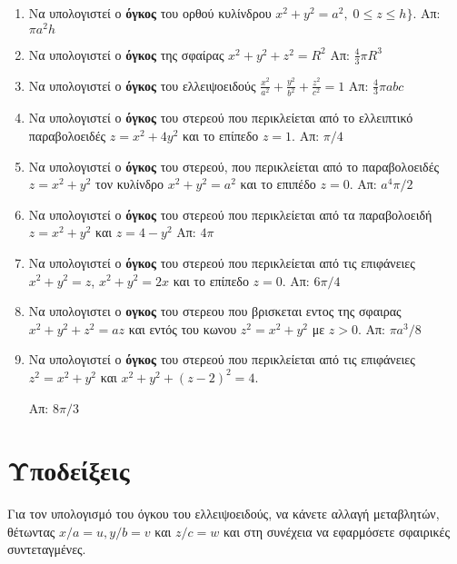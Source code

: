\begin{enumerate}
  \item Να υπολογιστεί ο \textbf{όγκος} του ορθού κυλίνδρου $ x^{2}+y^{2} = a^{2},
  \; 0 \leq z \leq h \}  $.  \hfill Απ:  $ \pi a^{2} h $

\item Να υπολογιστεί ο \textbf{όγκος} της σφαίρας $ x^{2}+y^{2}+z^{2} = R^{2} $
  \hfill Απ: $ \frac{4}{3} \pi R^{3} $ 

\item Να υπολογιστεί ο \textbf{όγκος} του ελλειψοειδούς $ \frac{x^{2}}{a^{2}} +
  \frac{y^{2}}{b^{2}} + \frac{z^{2}}{c^{2}} =1 $ 
  \hfill Απ: $ \frac{4}{3} \pi abc $ 

\item Να υπολογιστεί ο \textbf{όγκος} του στερεού που περικλείεται από το 
  ελλειπτικό παραβολοειδές $ z=x^{2}+4y^{2} $ και το επίπεδο $ z=1 $. 
  \hfill Απ: $ \pi /4 $ 

\item Να υπολογιστεί ο \textbf{όγκος} του στερεού, που περικλείεται από 
  το παραβολοειδές $ z = x^{2}+y^{2} $ τον κυλίνδρο $ x^{2}+y^{2}=a^{2} $ και 
  το επιπέδο $ z = 0$.  
  \hfill Απ: $ a^{4} {\pi}/{2} $  

\item Να υπολογιστεί ο \textbf{όγκος} του στερεού που περικλείεται από τα παραβολοειδή 
  $ z=x^{2}+y^{2} $ και $ z = 4-y^{2} $ 
  \hfill Απ: $ 4 \pi $ 


\item Να υπολογιστεί ο \textbf{όγκος} του στερεού που περικλείεται από τις επιφάνειες 
  $ x^{2}+y^{2}=z $, $ x^{2}+y^{2}=2x $ και το επίπεδο $ z=0 $. 
  \hfill Απ: $ {6 \pi}/{4} $ 

\item Να υπολογιστει ο \textbf{ογκος} του στερεου που βρισκεται εντος της σφαιρας 
  $x^2+y^2+z^2=az$ και εντός του κωνου $z^2=x^2+y^2$ με $ z>0 $. 
  \hfill Απ: $\pi{a^3}/{8}$

\item Να υπολογιστεί ο \textbf{όγκος} του στερεού που περικλείεται από τις επιφάνειες 
  $ z^{2}\!=x^{2}+y^{2} $ και $ x^{2}+y^{2}\!+(z-2)^{2}=4 $.  

  \hfill Απ: $ {8 \pi}/{3} $ 
\end{enumerate}

\enlargethispage{2\baselineskip}

\section*{Υποδείξεις}
 
\begin{myitemize}
  \item Για τον υπολογισμό του όγκου του ελλειψοειδούς, να κάνετε αλλαγή μεταβλητών,  
    θέτωντας $ x/a=u, y/b=v $ και $ z/c=w $ και στη συνέχεια να εφαρμόσετε σφαιρικές 
    συντεταγμένες.
\end{myitemize}





